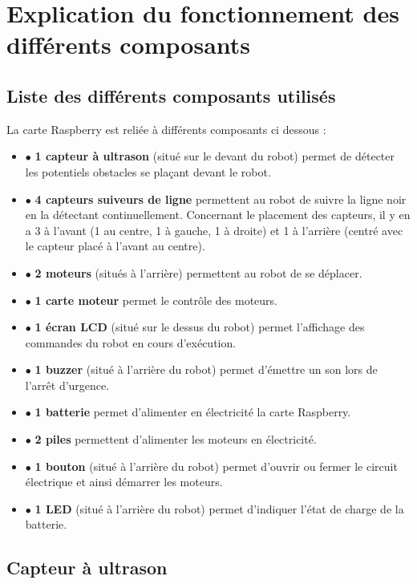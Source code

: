 \section{Explication du fonctionnement des différents composants}
    \subsection{Liste des différents composants utilisés}
    La carte Raspberry est reliée à différents composants ci dessous :    
	    \begin{itemize}
            \item $\bullet$ \textbf{1 capteur à ultrason} (situé sur le devant du robot) permet de détecter les potentiels obstacles se plaçant devant le robot.
            \item $\bullet$ \textbf{4 capteurs suiveurs de ligne} permettent au robot de suivre la ligne noir en la détectant continuellement. Concernant le placement des capteurs, il y en a 3 à l'avant (1 au centre, 1 à gauche, 1 à droite) et 1 à l'arrière (centré avec le capteur placé à l'avant au centre).
            \item $\bullet$ \textbf{2 moteurs} (situés à l'arrière) permettent au robot de se déplacer.
            \item $\bullet$ \textbf{1 carte moteur  } permet le contrôle des moteurs.  
            \item $\bullet$ \textbf{1 écran LCD} (situé sur le dessus du robot) permet l'affichage des commandes du robot en cours d'exécution.
            \item $\bullet$ \textbf{1 buzzer} (situé à l'arrière du robot) permet d'émettre un son lors de l'arrêt d'urgence.
            \item $\bullet$ \textbf{1 batterie } permet d'alimenter en électricité la carte Raspberry.
            \item $\bullet$ \textbf{2 piles } permettent d'alimenter les moteurs en électricité.
            \item $\bullet$ \textbf{1 bouton } (situé à l'arrière du robot) permet d'ouvrir ou fermer le circuit électrique et ainsi démarrer les moteurs.
            \item $\bullet$ \textbf{1 LED } (situé à l'arrière du robot) permet d'indiquer l'état de charge de la batterie.
        \end{itemize} 
    \vspace{5mm}
     
    \subsection{Capteur à ultrason} 

